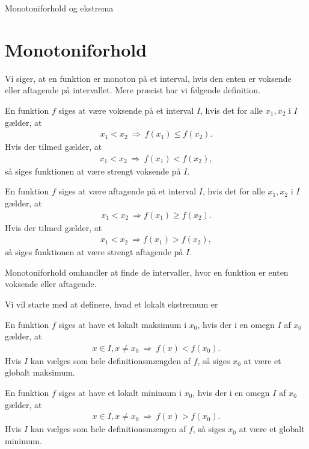 
\begin{center}
\Huge
Monotoniforhold og ekstrema
\end{center}
\section*{Monotoniforhold}
Vi siger, at en funktion er monoton på et interval, hvis den enten er voksende eller aftagende på intervallet. Mere præcist har vi følgende definition.
\begin{defn}
En funktion $f$ siges at være voksende på et interval $I$, hvis det for alle $x_1,x_2$ i $I$ gælder, at 
\begin{align*}
x_1<x_2 \ \Rightarrow \ f(x_1)\leq f(x_2).
\end{align*}
Hvis der tilmed gælder, at 
\begin{align*}
x_1<x_2 \ \Rightarrow \ f(x_1)<f(x_2),
\end{align*}
så siges funktionen at være strengt voksende på $I$. 

En funktion $f$ siges at være aftagende på et interval $I$, hvis det for alle $x_1,x_2$ i $I$ gælder, at 
\begin{align*}
x_1<x_2 \ \Rightarrow f(x_1)\geq f(x_2).
\end{align*}
Hvis der tilmed gælder, at 
\begin{align*}
x_1<x_2 \ \Rightarrow f(x_1)>f(x_2),
\end{align*}
så siges funktionen at være strengt aftagende på $I$.
\end{defn}
Monotoniforhold omhandler at finde de intervaller, hvor en funktion er enten voksende eller aftagende. 

Vi vil starte med at definere, hvad et lokalt ekstremum er
\begin{defn}
En funktion $f$ siges at have et lokalt maksimum i $x_0$, hvis der i en omegn $I$ af $x_0$ gælder, at 
\begin{align*}
x\in I,x\neq x_0 \ \Rightarrow\  f(x)<f(x_0).
\end{align*} 
Hvis $I$ kan vælges som hele definitionsmængden af $f$, så siges $x_0$ at være et globalt maksimum.


En funktion $f$ siges at have et lokalt minimum i $x_0$, hvis der i en omegn $I$ af $x_0$ gælder, at 
\begin{align*}
x\in I,x\neq x_0 \ \Rightarrow\ f(x)>f(x_0).
\end{align*}
Hvis $I$ kan vælges som hele definitionsmængen af $f$, så siges $x_0$ at være et globalt minimum.
\end{defn}

